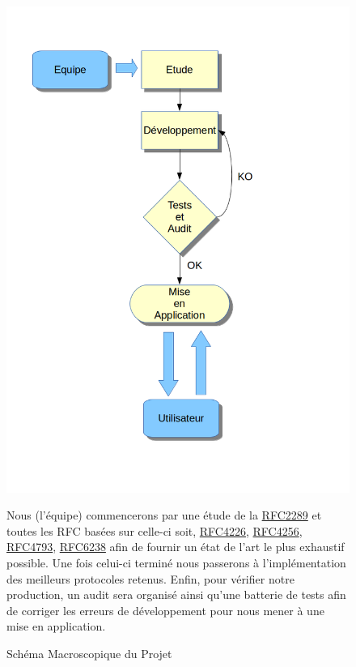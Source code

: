 \documentclass{"../../res/univ-projet"}
\begin{document}
\begin{figure}[h]
  \centering
  \includegraphics[scale=0.5]{../graphics/diagramme1.png}
  \caption{Schéma Macroscopique du Projet}
  \setlength{\parindent}{1cm}
  \begin{flushleft}
  Nous (l'équipe) commencerons par une étude de la \href{http://tools.ietf.org/html/rfc2289}{RFC2289} et toutes les RFC basées sur celle-ci
  soit, \href{http://tools.ietf.org/html/rfc4226}{RFC4226}, \href{http://tools.ietf.org/html/rfc4256}{RFC4256}, 
  \href{http://tools.ietf.org/html/rfc4793}{RFC4793}, \href{http://tools.ietf.org/html/rfc6238}{RFC6238} afin de fournir un état de l'art le plus exhaustif possible. Une fois celui-ci terminé nous passerons à
  l'implémentation des meilleurs protocoles retenus. Enfin, pour vérifier notre production,
  un audit sera organisé ainsi qu'une batterie de tests afin de corriger les erreurs de développement pour nous mener \`{a} 
  une mise en application. 
  \end{flushleft}
\end{figure}
\end{document}
